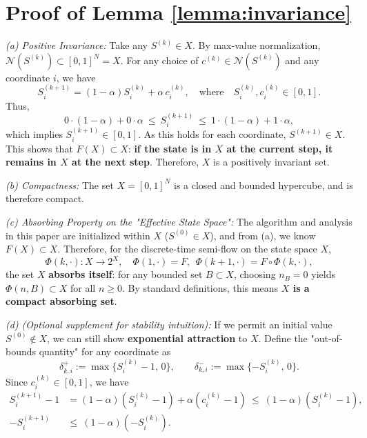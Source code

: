 \documentclass[journal]{IEEEtran}
\begin{document}
\section{Proof of Lemma \ref{lemma:invariance}}
\label{app:proof_lemma_invariance}
\begin{IEEEproof}
\textit{(a) Positive Invariance:}
Take any $S^{(k)}\in X$. By max-value normalization, $\mathcal N(S^{(k)})\subset[0,1]^N=X$. For any choice of $c^{(k)}\in\mathcal N(S^{(k)})$ and any coordinate $i$, we have
\begin{equation}
S^{(k+1)}_i=(1-\alpha)S^{(k)}_i+\alpha\,c^{(k)}_i,
\quad\text{where}\quad S^{(k)}_i,c^{(k)}_i\in[0,1].
\end{equation}
Thus,
\begin{equation}
0\cdot(1-\alpha)+0\cdot\alpha\ \le\ S^{(k+1)}_i\ \le\ 1\cdot(1-\alpha)+1\cdot\alpha,
\end{equation}
which implies $S^{(k+1)}_i\in[0,1]$. As this holds for each coordinate, $S^{(k+1)}\in X$. This shows that $F(X)\subset X$: \textbf{if the state is in $X$ at the current step, it remains in $X$ at the next step}. Therefore, $X$ is a positively invariant set.

\textit{(b) Compactness:}
The set $X=[0,1]^N$ is a closed and bounded hypercube, and is therefore compact.

\textit{(c) Absorbing Property on the "Effective State Space":}
The algorithm and analysis in this paper are initialized within $X$ ($S^{(0)}\in X$), and from (a), we know $F(X)\subset X$. Therefore, for the discrete-time semi-flow on the state space $X$,
\begin{equation}
\Phi(k,\cdot):X\to 2^X,\quad \Phi(1,\cdot)=F,\ \ \Phi(k+1,\cdot)=F\circ\Phi(k,\cdot),
\end{equation}
the set $X$ \textbf{absorbs itself}: for any bounded set $B\subset X$, choosing $n_B=0$ yields $\Phi(n,B)\subset X$ for all $n\ge 0$. By standard definitions, this means \textbf{$X$ is a compact absorbing set}.

\textit{(d) (Optional supplement for stability intuition):}
If we permit an initial value $S^{(0)}\notin X$, we can still show \textbf{exponential attraction} to $X$. Define the "out-of-bounds quantity" for any coordinate as
\begin{equation}
\delta^+_{k,i}:=\max\{S^{(k)}_i-1,\,0\},\qquad 
\delta^-_{k,i}:=\max\{-S^{(k)}_i,\,0\}.
\end{equation}
Since $c^{(k)}_i\in[0,1]$, we have
\begin{equation}
\begin{aligned}
S^{(k+1)}_i-1 &= (1-\alpha)(S^{(k)}_i-1)+\alpha(c^{(k)}_i-1)\ \le\ (1-\alpha)(S^{(k)}_i-1),\\
-S^{(k+1)}_i &\le\ (1-\alpha)(-S^{(k)}_i).
\end{aligned}
\end{equation}



\end{IEEEproof}
\end{document}
